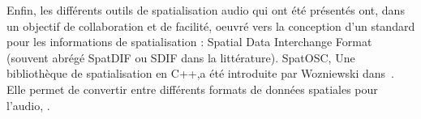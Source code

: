 \documentclass[french,12pt]{article}
\begin{document}
Enfin, les différents outils de spatialisation audio qui ont été présentés ont, dans un objectif de collaboration 
et de facilité, oeuvré vers la conception d'un standard pour les informations de spatialisation : Spatial Data Interchange Format (souvent abrégé SpatDIF ou SDIF dans la littérature)\cite{kendall_towards_2008,peters_spatial_2013}. SpatOSC, Une bibliothèque de spatialisation en C++,a été introduite par Wozniewski dans~\cite{wozniewski_spatosc:_2012}. Elle permet de convertir entre différents formats de données spatiales pour l'audio, .



\newpage
\printbibliography
\end{document}
